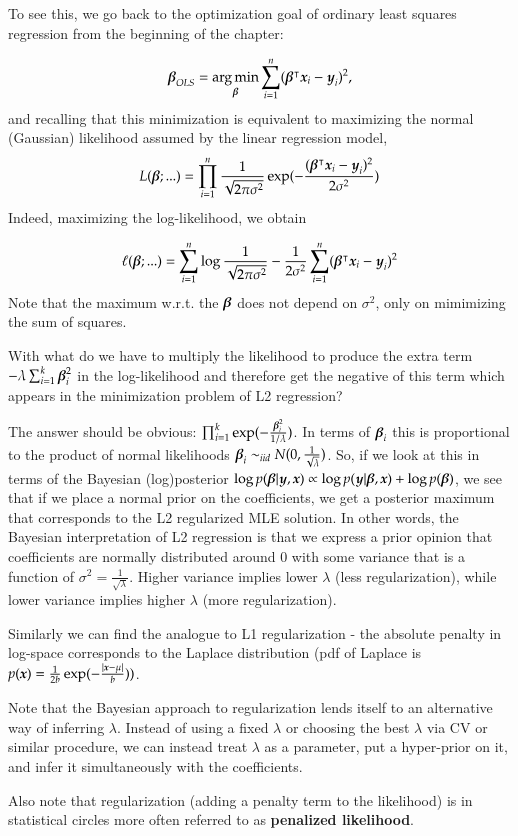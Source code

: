 \begin{refsection}
To see this, we go back to the optimization goal of ordinary least squares regression from the beginning of the chapter:

$$\boldsymbol{\beta}_{OLS} = \operatorname*{arg\,min}_{\boldsymbol{\beta}} \sum_{i=1}^n (\boldsymbol{\beta}^\intercal\boldsymbol{x}_i - \boldsymbol{y}_i)^2,$$
%
and recalling that this minimization is equivalent to maximizing the normal (Gaussian) likelihood assumed by the linear regression model,
%
$$L(\boldsymbol{\beta};...) = \prod_{i=1}^n \frac{1}{\sqrt{2\pi\sigma^2}}\exp(-\frac{(\boldsymbol{\beta}^\intercal\boldsymbol{x}_i - \boldsymbol{y}_i)^2}{2\sigma^2})$$
Indeed, maximizing the log-likelihood, we obtain
 
$$\ell(\boldsymbol{\beta};...) = \sum_{i=1}^n \log\frac{1}{\sqrt{2\pi\sigma^2}} - \frac{1}{2\sigma^2}\sum_{i=1}^n(\boldsymbol{\beta}^\intercal\boldsymbol{x}_i - \boldsymbol{y}_i)^2$$
%
Note that the maximum w.r.t. the $\boldsymbol{\beta}$ does not depend on $\sigma^2$, only on mimimizing the sum of squares.

With what do we have to multiply the likelihood to produce the extra term $-\lambda \sum_{i=1}^k \boldsymbol{\beta}_i^2$ in the log-likelihood and therefore get the negative of this term which appears in the minimization problem of L2 regression? 

The answer should be obvious: $\prod_{i=1}^k\exp(-\frac{\boldsymbol{\beta}_i^2}{1 / \lambda})$. In terms of $\boldsymbol{\beta}_i$ this is proportional to the product of normal likelihoods $\boldsymbol{\beta}_i \sim_{iid} N(0, \frac{1}{\sqrt{\lambda}})$. So, if we look at this in terms of the Bayesian (log)posterior $\log p(\boldsymbol{\beta} | \boldsymbol{y}, \boldsymbol{x}) \propto \log p(\boldsymbol{y} | \boldsymbol{\beta}, \boldsymbol{x}) + \log p(\boldsymbol{\beta})$, we see that if we place a normal prior on the coefficients, we get a posterior maximum that corresponds to the L2 regularized MLE solution. In other words, the Bayesian interpretation of L2 regression is that we express a prior opinion that coefficients are normally distributed around 0 with some variance that is a function of $\sigma^2 = \frac{1}{\sqrt{\lambda}}$. Higher variance implies lower $\lambda$ (less regularization), while lower variance implies higher $\lambda$ (more regularization).

Similarly we can find the analogue to L1 regularization - the absolute penalty in log-space corresponds to the Laplace distribution (pdf of Laplace is $p(\boldsymbol{x}) = \frac{1}{2b}\exp(-\frac{|\boldsymbol{x} - \mu|}{b}))$.

Note that the Bayesian approach to regularization lends itself to an alternative way of inferring $\lambda$. Instead of using a fixed $\lambda$ or choosing the best $\lambda$ via CV or similar procedure, we can instead treat $\lambda$ as a parameter, put a hyper-prior on it, and infer it simultaneously with the coefficients.

Also note that regularization (adding a penalty term to the likelihood) is in statistical circles more often referred to as \textbf{penalized likelihood}.


\end{refsection}
